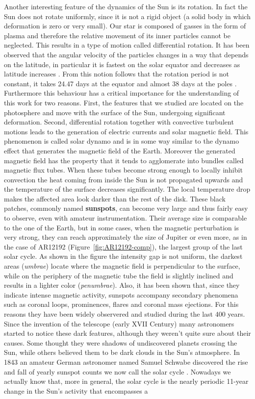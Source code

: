 Another interesting feature of the dynamics of the Sun is its rotation. In fact the Sun does not rotate uniformly, since it is not a rigid object (a solid body in which deformation is zero or very small). Our star is composed of gasses in the form of plasma and therefore the relative movement of its inner particles cannot be neglected. This results in a type of motion called differential rotation. It has been observed that the angular velocity of the particles changes in a way that depends on the latitude, in particular it is fastest on the solar equator and decreases as latitude increases \cite{diffrot}. From this notion follows that the rotation period is not constant, it takes 24.47 days at the equator and almost 38 days at the poles \cite{diffrotrev}. Furthermore this behaviour has a critical importance for the understanding of this work for two reasons. First, the features that we studied are located on the photosphere and move with the surface of the Sun, undergoing significant deformation. Second, differential rotation together with convective turbulent motions leads to the generation of electric currents and solar magnetic field. This phenomenon is called solar dynamo and is in some way similar to the dynamo effect that generates the magnetic field of the Earth. Moreover the generated magnetic field has the property that it tends to agglomerate into bundles called magnetic flux tubes. When these tubes become strong enough to locally inhibit convection the heat coming from inside the Sun is not propagated upwards and the temperature of the surface decreases significantly. The local temperature drop makes the affected area look darker than the rest of the disk. These black patches, commonly named \textbf{sunspots}, can become very large and thus fairly easy to observe, even with amateur instrumentation. Their average size is comparable to the one of the Earth, but in some cases, when the magnetic perturbation is very strong, they can reach approximately the size of Jupiter or even more, as in the case of AR12192 (Figure~\ref{fig:AR12192-comp}), the largest group of the last solar cycle. As shown in the figure the intensity gap is not uniform, the darkest areas (\textit{umbrae}) locate where the magnetic field is perpendicular to the surface, while on the periphery of the magnetic tube the field is slightly inclined and results in a lighter color (\textit{penumbrae}). Also, it has been shown that, since they indicate intense magnetic activity, sunspots accompany secondary phenomena such as coronal loops, prominences, flares and coronal mass ejections. For this reasons they have been widely observered and studied during the last 400 years. Since the invention of the telescope \cite{king2003history} (early XVII Century) many astronomers started to notice these dark features, although they weren't quite sure about their causes. Some thought they were shadows of undiscovered planets crossing the Sun, while others believed them to be dark clouds in the Sun's atmosphere. In 1843 an amateur German astronomer named Samuel Schwabe discovered the rise and fall of yearly sunspot counts we now call the solar cycle \cite{schwabe1843solar}. Nowadays we actually know that, more in general, the solar cycle is the nearly periodic 11-year change in the Sun's activity that encompasses a 